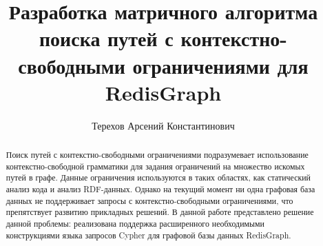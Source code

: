 \title{Разработка матричного алгоритма поиска путей с контекстно-свободными ограничениями для RedisGraph}

\author{Терехов Арсений Константинович}


\maketitle

\begin{abstract}
Поиск путей с контекстно-свободными ограничениями подразумевает использование контекстно-свободной грамматики для задания ограничений на множество искомых путей в графе. Данные ограничения используются в таких областях, как статический анализ кода и анализ RDF-данных. Однако на текущий момент ни одна графовая база данных не поддерживает запросы с контекстно-свободными ограничениями, что препятствует развитию прикладных решений. В данной работе представлено решение данной проблемы: реализована поддержка расширенного необходимыми конструкциями языка запросов Cypher для графовой базы данных RedisGraph.
\end{abstract}



